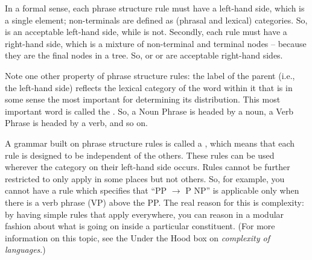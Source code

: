 In a formal sense, each phrase structure rule must have a left-hand side, which is a single  element; non-terminals are defined as (phrasal and lexical) categories.  So,  is an acceptable left-hand side, while  is not.  Secondly, each rule must have a right-hand side, which is a mixture of non-terminal and terminal nodes --  because they are the final nodes in a tree.  So,  or  or  are acceptable right-hand sides.


Note one other property of phrase structure rules: the label of the parent (i.e., the left-hand side) reflects the lexical category of the word within it that is in some sense the most important for determining its distribution. This most important word is called the . So, a Noun Phrase is headed by a noun, a Verb Phrase is headed by a verb, and so on.

A grammar built on phrase structure rules is called a , which means that each rule is designed to be independent of the others.  These rules can be used wherever the category on their left-hand side occurs. Rules cannot be further restricted to only apply in some places but not others.  So, for example, you cannot have a rule which specifies that ``PP $\to$   P NP'' is applicable only when there is a verb phrase (VP) above the PP.  The real reason for this is complexity: by having simple rules that apply everywhere, you can reason in a modular fashion about what is going on inside a particular constituent.  (For more information on this topic, see the Under the Hood box on \emph{complexity of languages}.)


